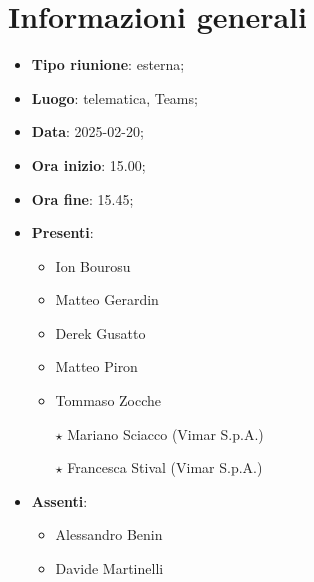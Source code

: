 \section{Informazioni generali}
\begin{itemize}
  \item \textbf{Tipo riunione}: esterna;
  \item \textbf{Luogo}: telematica, Teams;
  \item \textbf{Data}: 2025-02-20;
  \item \textbf{Ora inizio}: 15.00;
  \item \textbf{Ora fine}: 15.45;
  
  \item \textbf{Presenti}:
  \begin{itemize}
    
    \item Ion Bourosu
    \item Matteo Gerardin
    \item Derek Gusatto
    
    \item Matteo Piron
    \item Tommaso Zocche
     \item[$\star$] Mariano Sciacco (Vimar S.p.A.)
    \item[$\star$] Francesca Stival (Vimar S.p.A.)
  \end{itemize}

  \item \textbf{Assenti}:
 \begin{itemize}
    \item Alessandro Benin
   
    \item Davide Martinelli
   
  \end{itemize}
\end{itemize}